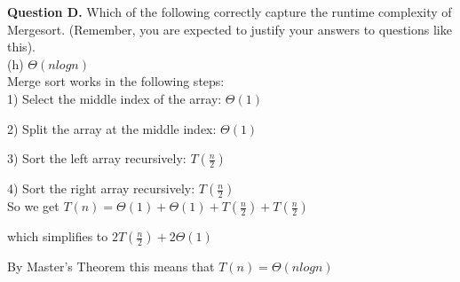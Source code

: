 \documentclass[12pt]{article}
\begin{document}
\textbf{Question D.} Which of the following correctly capture the runtime complexity of Mergesort. (Remember, you are expected to justify your answers to questions like this).\\

(h) $\Theta(n log n)$\\

Merge sort works in the following steps:\\

1) Select the middle index of the array: $\Theta(1)$

2) Split the array at the middle index: $\Theta(1)$

3) Sort the left array recursively: $T(\frac{n}{2})$

4) Sort the right array recursively: $T(\frac{n}{2})$\\

So we get $T(n) = \Theta(1) + \Theta(1) + T(\frac{n}{2}) + T(\frac{n}{2})$ 

which simplifies to $2T(\frac{n}{2}) + 2\Theta(1)$

By Master's Theorem this means that $T(n) = \Theta(n log n)$
\end{document}
